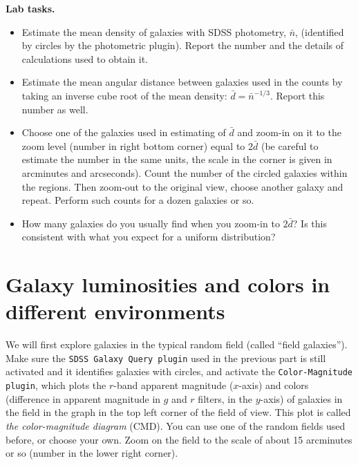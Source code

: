 \documentclass[12pt]{article}
\begin{document}
{\bf Lab tasks.} 
{\it
\begin{itemize}
\item Estimate the mean density of galaxies with SDSS photometry, $\bar{n}$, (identified by circles
by the photometric plugin). Report the number and the details of calculations used to 
obtain it. 
\item Estimate the mean angular distance between galaxies used in the counts
by taking an inverse cube root of the mean density: $\bar{d}=\bar{n}^{-1/3}$.
Report this number as well. 
\item Choose one of the galaxies used in estimating of $\bar{d}$ and 
zoom-in on it to the zoom level (number in right bottom corner) equal 
to $2\bar{d}$ (be careful to estimate the number in the same units, the scale in the
corner is given in arcminutes and arcseconds). Count the number of 
the circled galaxies within the regions. Then zoom-out to the original view, 
choose another galaxy and repeat. Perform such counts for a dozen galaxies or
so. 
\item How many galaxies do you usually find when you zoom-in to $2\bar{d}$?
Is this consistent with what you expect for a uniform distribution?  
\end{itemize}
}

\section*{Galaxy luminosities and colors in different environments}

We will first explore galaxies in the typical random field (called ``field galaxies''). 
Make sure the \texttt{SDSS Galaxy Query plugin} used in the previous part is still
activated and it identifies galaxies with circles, and activate the \texttt{Color-Magnitude plugin}, which plots the $r$-band apparent magnitude ($x$-axis) and colors (difference
in apparent magnitude in $g$ and $r$ filters, in the $y$-axis) of galaxies in the field
in the graph in the top left corner of the field of view. This plot is called {\it the color-magnitude diagram\/} (CMD). 
You can use one of the random fields used before, or choose your own. Zoom on the field
to the scale of about 15 arcminutes or so (number in the lower right corner).\\[2mm] 
\end{document}
